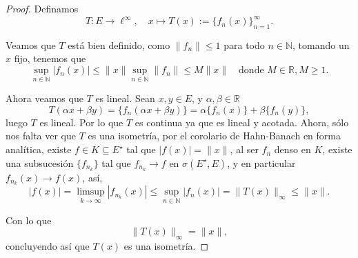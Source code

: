 \begin{itemize}
\begin{proof}
Definamos
\[
T : E \to \ell^\infty, \quad x \mapsto T(x) := \{ f_n(x) \}_{n=1}^\infty.
\]

Veamos que $T$ está bien definido, como $\|f_n\| \leq 1$ para todo $n \in \mathbb{N}$, tomando un $x$ fijo, tenemos que
\[
\sup_{n \in \mathbb{N}} |f_n(x)| \leq \|x\| \sup_{n \in \mathbb{N}} \|f_n\| \leq M \|x\| \quad \text{donde } M \in \mathbb{R}, M \geq 1.
\]

Ahora veamos que $T$ es lineal. Sean $x, y \in E$, y $\alpha, \beta \in \mathbb{R}$
\[
T(\alpha x + \beta y) = \{ f_n(\alpha x + \beta y) \} = \alpha \{ f_n(x) \} + \beta \{ f_n(y) \},
\]
luego $T$ es lineal. Por lo que $T$ es continua ya que es lineal y acotada. Ahora, sólo nos falta ver que $T$ es una isometría, por el corolario de Hahn-Banach en forma analítica, existe $f \in K \subseteq E^{\star}$ tal que $|f(x)| = \|x\|$, al ser $f_n$ denso en $K $, existe una subsucesión $\{f_{n_k}\}$ tal que $f_{n_k} \to f$ en $\sigma(E^{\star}, E)$, y en particular $f_{n_k}(x) \to f(x)$, así,
\[
|f(x)| = \limsup_{k \to \infty} |f_{n_k}(x)| \leq \sup_{n \in \mathbb{N}} |f_n(x)| = \|T(x)\|_\infty \leq \|x\|.
\]

Con lo que 
\[
\|T(x)\|_\infty = \|x\|,
\]
concluyendo así que $T(x)$ es una isometría.

 \end{proof}
 \end{itemize}
 